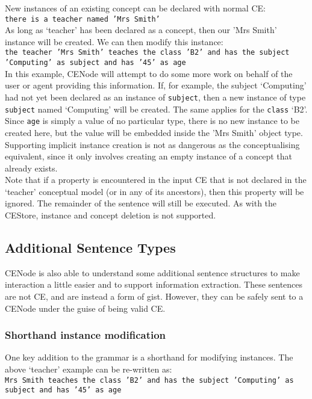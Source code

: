 \documentclass{article}
\begin{document}
New instances of an existing concept can be declared with normal CE:\\
\texttt{there is a teacher named 'Mrs Smith'}\\

As long as `teacher' has been declared as a concept, then our 'Mrs Smith' instance will be created. We can then modify this instance:\\
\texttt{the teacher 'Mrs Smith' teaches the class 'B2' and has the subject 'Computing' as subject and has '45' as age}\\

In this example, CENode will attempt to do some more work on behalf of the user or agent providing this information. If, for example, the subject `Computing' had not yet been declared as an instance of \texttt{subject}, then a new instance of type \texttt{subject} named `Computing' will be created. The same applies for the \texttt{class} `B2'. Since \texttt{age} is simply a value of no particular type, there is no new instance to be created here, but the value will be embedded inside the 'Mrs Smith' object type. Supporting implicit instance creation is not as dangerous as the conceptualising equivalent, since it only involves creating an empty instance of a concept that already exists.\\

Note that if a property is encountered in the input CE that is not declared in the `teacher' conceptual model (or in any of its ancestors), then this property will be ignored. The remainder of the sentence will still be executed. As with the CEStore, instance and concept deletion is not supported.\\

\subsection{Additional Sentence Types}
CENode is also able to understand some additional sentence structures to make interaction a little easier and to support information extraction. These sentences are not CE, and are instead a form of gist. However, they can be safely sent to a CENode under the guise of being valid CE.\\


\subsubsection{Shorthand instance modification}

One key addition to the grammar is a shorthand for modifying instances. The above `teacher' example can be re-written as:\\
\texttt{Mrs Smith teaches the class 'B2' and has the subject 'Computing' as subject and has '45' as age}\\
\end{document}
